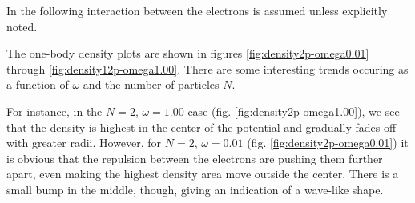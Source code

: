 \documentclass[aps,prb,twocolumn,floatfix]{revtex4}
\begin{document}

\begin{figure*}
    \centering
    \caption{One-body density for $N=12$ particles with $\omega = 1.00$. Note that this plot was made by sampling along a line and then rotating the result around the $z$-axis. This procedure seems to have had some flaws, so ignore the ``square''-like shape of the plot.}
    \label{fig:density12p-omega1.00}
\end{figure*}

In the following interaction between the electrons is assumed unless explicitly noted.

The one-body density plots are shown in figures \ref{fig:density2p-omega0.01} through \ref{fig:density12p-omega1.00}. There are some interesting trends occuring as a function of $\omega$ and the number of particles $N$.

For instance, in the $N=2$, $\omega = 1.00$ case (fig. \ref{fig:density2p-omega1.00}), we see that the density is highest in the center of the potential and gradually fades off with greater radii. However, for $N=2$, $\omega=0.01$ (fig. \ref{fig:density2p-omega0.01}) it is obvious that the repulsion between the electrons are pushing them further apart, even making the highest density area move outside the center. There is a small bump in the middle, though, giving an indication of a wave-like shape.
\end{document}
